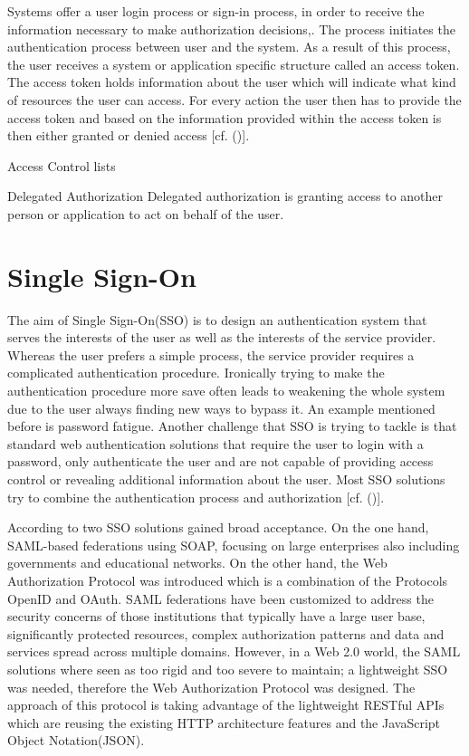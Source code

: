   Systems offer a user login process or sign-in process, in order to receive the information necessary to make authorization decisions,. The process initiates the authentication process between user and the system. As a result of this process, the user receives a system or application specific structure called an access token. The access token holds information about the user which will indicate what kind of resources the user can access. For every action the user then has to provide the access token and based on the information provided within the access token is then either granted or denied access [cf. (\cite{Todorov:2007:MUI})]. 


Access Control lists

Delegated Authorization
Delegated authorization is granting access to another person or application to act on behalf of the user.
\cite{Boyed:2012:GSOA}


\section{Single Sign-On}

The aim of Single Sign-On(SSO) is to design an authentication system that serves the interests of the user as well as the interests of the service provider. Whereas the user prefers a simple process, the service provider requires a complicated authentication procedure. Ironically trying to make the authentication procedure more save often leads to weakening the whole system due to the user always  finding new ways to bypass it. An example mentioned before is password fatigue. Another challenge that SSO is trying to tackle is that standard web authentication solutions that require the user to login with a password, only authenticate the user and are not capable of providing access control or revealing additional information about the user. Most SSO solutions try to combine the authentication process and authorization [cf. (\cite{Prochazka:2010:UCA})].

According to \cite{Lynch:2017:IIG} two SSO solutions gained broad acceptance. On the one hand, SAML-based federations using SOAP, focusing on large enterprises also including governments and educational networks. On the other hand, the Web Authorization Protocol was introduced which is a combination of the Protocols OpenID and OAuth. SAML federations have been customized to address the security concerns of those institutions that typically have a large user base, significantly protected resources, complex authorization patterns and data and services spread across multiple domains. However, in a Web 2.0 world, the SAML solutions where seen as too rigid and too severe to maintain; a lightweight SSO was needed, therefore the Web Authorization Protocol was designed. The approach of this protocol is taking advantage of the lightweight RESTful APIs which are reusing the existing HTTP architecture features and the JavaScript Object Notation(JSON).

